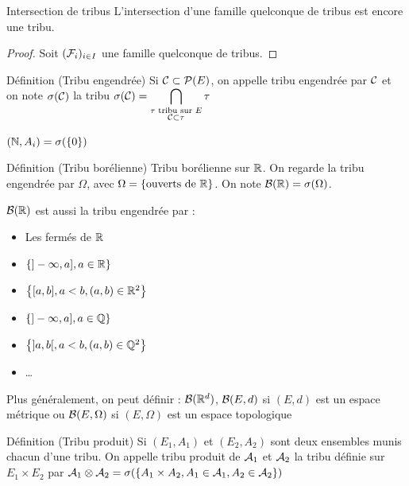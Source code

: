 \documentclass[]{report}
\begin{document}
\begin{prop}{Intersection de tribus}{}
    L'intersection d'une famille quelconque de tribus est encore une tribu.
\end{prop}

\begin{proof}{}{}
    Soit $(\mathcal{F}_i)_{i\in I}$ une famille quelconque de tribus.
\end{proof}

\begin{df}{Définition (Tribu engendrée)}{}
Si $\mathcal{C}\subset\mathcal{P}(E)$, on appelle tribu engendrée par $\mathcal{C}$ et on note $\sigma(\mathcal{C})$ la tribu $\displaystyle{\sigma(\mathcal{C})=\bigcap_{\substack{\tau\text{ tribu sur }E\\\mathcal{C}\subset\tau}}\tau}$
\end{df}

\begin{ex}{}{}
    $(\mathbb{N},A_i)=\sigma(\{0\})$
\end{ex}

\begin{df}{Définition (Tribu borélienne)}{}
    Tribu borélienne sur $\mathbb{R}$. On regarde la tribu engendrée par $\Omega$, avec $\Omega=\left\{ \text{ouverts de }\mathbb{R}\right\}$. On note $\mathcal{B}(\mathbb{R})=\sigma(\Omega)$.
\end{df}

\begin{prop}{}{}
    $\mathcal{B}(\mathbb{R})$ est aussi la tribu engendrée par :
    \begin{itemize}
        \item Les fermés de $\mathbb{R}$
        \item $\left\{  ]-\infty,a],a\in\mathbb{R}  \right\}$
        \item $\left\{  [a,b],a<b,(a,b)\in\mathbb{R}^2  \right\}$
        \item $\left\{  ]-\infty,a],a\in\mathbb{Q}  \right\}$
        \item $\left\{  ]a,b[,a<b,(a,b)\in\mathbb{Q}^2  \right\}$
        \item \dots
    \end{itemize}
    Plus généralement, on peut définir :
    $\mathcal{B}(\mathbb{R}^d)$, $\mathcal{B}(E,d)$ si $(E,d)$ est un espace métrique ou $\mathcal{B}(E,\Omega)$ si $(E,\Omega)$ est un espace topologique
\end{prop}

\begin{df}{Définition (Tribu produit)}{}
    Si $(E_1,A_1)$ et $(E_2,A_2)$ sont deux ensembles munis chacun d'une tribu. On appelle tribu produit de $\mathcal{A}_1$ et $\mathcal{A}_2$ la tribu définie sur $E_1\times E_2$ par $\mathcal{A}_1\otimes\mathcal{A}_2=\sigma(\left\{ A_1\times A_2,A_1\in\mathcal{A}_1,A_2\in\mathcal{A}_2 \right\})$
\end{df}
\end{document}
